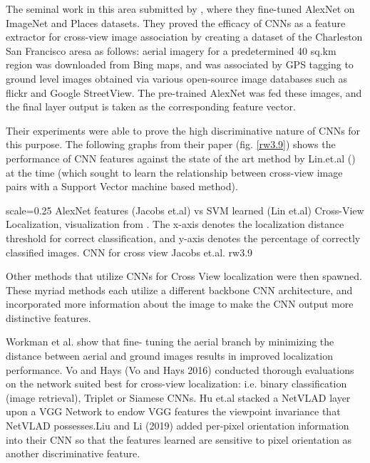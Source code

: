 The seminal work in this area submitted by \cite{Jacobs2015}, where they fine-tuned AlexNet on ImageNet and Places datasets. They proved the efficacy of CNNs as a feature extractor for cross-view image association by creating a dataset of the Charleston San Francisco aresa as follows: aerial imagery for a predetermined 40 sq.km region was downloaded from Bing maps, and was associated by GPS tagging to ground level images obtained via various open-source image databases such as flickr and Google StreetView. The pre-trained AlexNet was fed these images, and the final layer output is taken as the corresponding feature vector. 

Their experiments were able to prove the high discriminative nature of CNNs for this purpose. The following graphs from their paper (fig. \ref{rw3.9}) shows the performance of CNN features against the state of the art method by Lin.et.al (\cite{Lin2013}) at the time (which sought to learn the relationship between cross-view image pairs with a Support Vector machine based method).

{scale=0.25}%
{AlexNet features (Jacobs et.al) vs SVM learned (Lin et.al) Cross-View Localization, visualization from \cite{Jacobs2015}. The x-axis denotes the localization distance threshold for correct classification, and y-axis denotes the percentage of correctly classified images.}%
{CNN for cross view Jacobs et.al.}%
{rw3.9} %

Other methods that utilize CNNs for Cross View localization were then spawned. These myriad methods each utilize a different backbone CNN architecture, and incorporated more information about the image to make the CNN output more distinctive features.

Workman et al. show that fine- tuning the aerial branch by minimizing the distance between aerial and ground images results in improved localization performance.  Vo and Hays (Vo and Hays 2016) conducted thorough evaluations on the network suited best for cross-view localization: i.e. binary classification (image retrieval), Triplet or Siamese CNNs. Hu et.al stacked a NetVLAD layer upon a VGG Network to endow VGG features the viewpoint invariance that NetVLAD possesses.Liu and Li (2019) added per-pixel orientation information into their CNN so that the features learned are sensitive to pixel orientation as another discriminative feature. 

